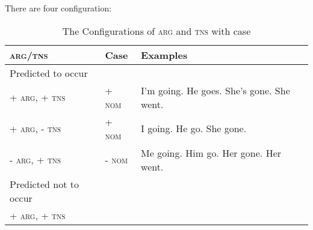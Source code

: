 There are four configuration:

\begin{table}[]
    \centering
    \caption{The Configurations of \textsc{arg} and \textsc{tns} with case}
    \begin{tabular}{llll}
    \toprule
        \textsc{arg/tns} & Case  & Examples  \\
    \hline
    Predicted to occur & & \\
         \textsc{+ arg, + tns} & \textsc{+ nom} & I'm going. He goes. She's gone. She went.\\
         \textsc{+ arg, - tns} & \textsc{+ nom}  & I going. He go. She gone. \\
         \textsc{- arg, + tns} & \textsc{- nom} & Me going. Him go. Her gone. Her went. \\
       \hline
       Predicted not to occur & & \\
       \textsc{+ arg, + tns} & 
        \bottomrule
    \end{tabular}
    \label{tab: pattern}
\end{table}






